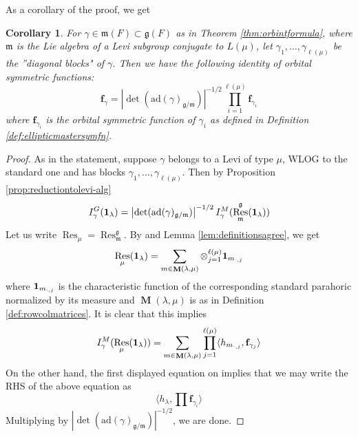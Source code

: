 \documentclass{amsart}
\numberwithin{equation}{section}
\newtheorem{corollary}[lemma]{Corollary}%
\theoremstyle{definition}
\def\16{{\bf 16}}
\def\1{{\bf 1}}
\DeclareMathOperator{\Res}{\mathrm{Res}}
\DeclareMathOperator{\MM}{\mathbf{M}}
\newcommand{\frs}{\mathbf{f}_{\vec{p},\vec{q}}}
\newcommand{\fpq}{\frs}
\newcommand{\fgamma}{\mathbf{f}_{\gamma}}
\newcommand{\fm}{\mathfrak{m}}
\newcommand{\fg}{\mathfrak{g}}
\newcommand{\ad}{\mathrm{ad}}
\begin{document}
As a corollary of the proof, we get 
\begin{corollary}
\label{cor:mastersymfnmanycomponents}
For $\gamma \in \fm(F)\subset \fg(F)$ as in Theorem \ref{thm:orbintformula}, where $\fm$ is the Lie algebra of a Levi subgroup conjugate to $L(\mu)$, let $\gamma_1,\ldots,\gamma_{\ell(\mu)}$ be the ''diagonal blocks" of $\gamma$. Then we have the following identity of orbital symmetric functions:
$$\fgamma=\left|\det(\ad(\gamma)_{\fg/\fm})\right|^{-1/2} \prod_{i=1}^{\ell(\mu)} \mathbf{f}_{\gamma_i}$$
where $\mathbf{f}_{\gamma_i}$ is the orbital symmetric function of $\gamma_i$ as defined in Definition \ref{def:ellipticmastersymfn}.
\end{corollary}
\begin{proof}
As in the statement, suppose $\gamma$ belongs to a Levi of type $\mu$, WLOG to the standard one and has blocks $\gamma_1,\ldots, \gamma_{\ell(\mu)}$. Then by Proposition \ref{prop:reductiontolevi-alg}
$$I^G_\gamma(\1_\lambda)=\left|\det(\ad(\gamma)_{\fg/\fm})\right|^{-1/2} I_\gamma^M(\Res_\fm^\fg(\1_\lambda))$$
Let us write $\Res_\mu=\Res_\fm^\fg$. By \cite[Lemme IV 3.]{W2} and Lemma \ref{lem:definitionsagree}, we get 
$$\Res_\mu(\1_\lambda)=\sum_{m\in \MM(\lambda,\mu)} \otimes_{j=1}^{\ell(\mu)} \1_{m_{\cdot,j}}$$ where $\1_{m_{\cdot,j}}$ is the characteristic function of the corresponding standard parahoric normalized by its measure and $\MM(\lambda,\mu)$ is as in Definition \ref{def:rowcolmatrices}.
It is clear that this implies 
$$I_\gamma^M(\Res_\mu(\1_\lambda))=\sum_{m\in \MM(\lambda,\mu)}\prod_{j=1}^{\ell(\mu)}\langle h_{m_{\cdot,j}},\mathbf{f}_{\gamma_j}\rangle$$
On the other hand, the first displayed equation on \cite[p. 883]{W2} implies that we may write 
the RHS of the above equation as 
$$\langle h_\lambda, \prod \mathbf{f}_{\gamma_i}\rangle$$
Multiplying by $\left|\det(\ad(\gamma)_{\fg/\fm})\right|^{-1/2}$, we are done.
\end{proof}
\end{document}
